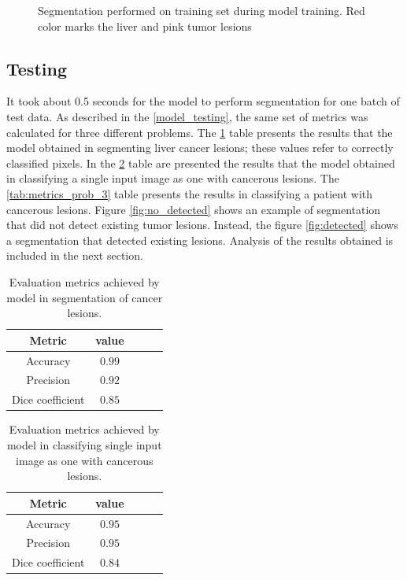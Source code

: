 \begin{figure}[H]
	\caption{Segmentation performed on training set during model training. Red color marks the liver and pink tumor lesions}
	\label{rys:example_segs}
\end{figure}

\subsection{Testing}

It took about 0.5 seconds for the model to perform segmentation for one batch of test data. As described in the \ref{model_testing}, the same set of metrics was calculated for three different problems. The \ref{tab:metrics_prob_1} table presents the results that the model obtained in segmenting liver cancer lesions; these values refer to correctly classified pixels. In the \ref{tab:metrics_prob_2} table are presented the results that the model obtained in classifying a single input image as one with cancerous lesions. The \ref{tab:metrics_prob_3} table presents the results in classifying a patient with cancerous lesions. Figure \ref{fig:no_detected} shows an example of segmentation that did not detect existing tumor lesions. Instead, the figure \ref{fig:detected} shows a segmentation that detected existing lesions. Analysis of the results obtained is included in the next section.



\begin{table}[h!]
    \centering
    \begin{tabular}{|c|c|c|c|c|}
    \hline
        Metric & value  \\
        \hline 
        Accuracy & $0.99$ \\
        \hline
        Precision & $0.92$\\
        \hline
        Dice coefficient & $0.85$\\
        \hline
    \end{tabular}
    \caption{Evaluation metrics achieved by model in segmentation of cancer lesions.}
    \label{tab:metrics_prob_1}
\end{table}

\begin{table}[h!]
    \centering
    \begin{tabular}{|c|c|c|c|c|}
    \hline
        Metric & value  \\
        \hline 
        Accuracy & $0.95$ \\
        \hline
        Precision & $0.95$\\
        \hline
        Dice coefficient & $0.84$\\
        \hline
    \end{tabular}
    \caption{Evaluation metrics achieved by model in classifying single input image as one with cancerous lesions. }
    \label{tab:metrics_prob_2}
\end{table}

